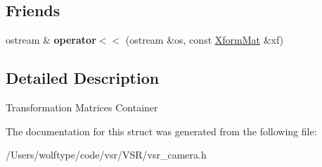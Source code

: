 \subsection*{Friends}
\begin{DoxyCompactItemize}
\item 
\hypertarget{structvsr_1_1_xform_mat_a974530554c3c8e7866a02a19079a363d}{ostream \& {\bfseries operator$<$$<$} (ostream \&os, const \hyperlink{structvsr_1_1_xform_mat}{Xform\-Mat} \&xf)}\label{structvsr_1_1_xform_mat_a974530554c3c8e7866a02a19079a363d}

\end{DoxyCompactItemize}


\subsection{Detailed Description}
Transformation Matrices Container 

The documentation for this struct was generated from the following file\-:\begin{DoxyCompactItemize}
\item 
/\-Users/wolftype/code/vsr/\-V\-S\-R/vsr\-\_\-camera.\-h\end{DoxyCompactItemize}
